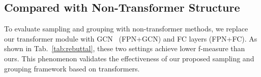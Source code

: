 \documentclass[10pt,twocolumn,letterpaper]{article}
\begin{document}
\subsection{Compared with Non-Transformer Structure}
To evaluate sampling and grouping with non-transformer methods, we replace our transformer module with GCN~\cite{li2019deepgcns} (FPN+GCN) and FC layers (FPN+FC).
As shown in Tab.~\ref{tab:rebuttal}, these two settings achieve lower f-measure than ours.
This phenomenon validates the effectiveness of our proposed sampling and grouping framework based on transformers.
\end{document}
